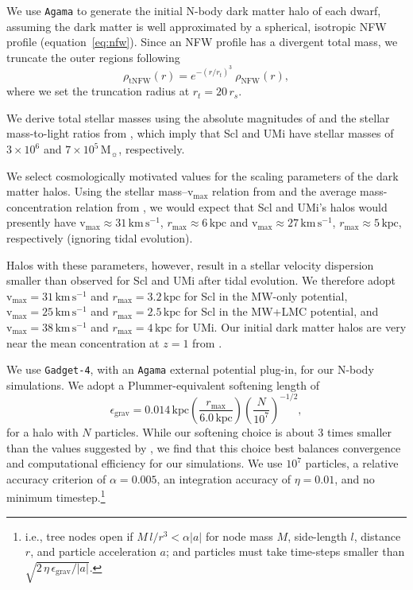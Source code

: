 \documentclass[times,trackchanges, twocolumn, twocolappendix]{aastex701}
\newcommand{\V}{\textrm{v}}
\newcommand{\vmax}{\V_\text{max}}
\newcommand{\rmax}{r_\text{max}}
\newcommand{\kpc}{\text{kpc}}
\newcommand{\kms}{\mathrm{km\,s^{-1}}}
\newcommand{\Mo}{\mathrm{M}_\sun}
\newcommand{\agama}{\texttt{Agama}}
\newcommand{\gadget}{\texttt{Gadget-4}}
\begin{document}
We use \agama{} \citep{agama} to generate the initial N-body dark matter
halo of each dwarf, assuming the dark matter is well approximated by a spherical, isotropic 
NFW profile (equation~\ref{eq:nfw}). Since an NFW profile has a divergent total mass, we truncate the outer regions following
\begin{equation}\label{eq:trunc_nfw}
    \rho_\text{tNFW}(r) = e^{-(r/r_t)^3}\ \rho_\text{NFW}(r),
\end{equation}
where we set the truncation radius at $r_t = 20 \, r_s$. 

We derive total stellar masses using the absolute magnitudes of \citet{munoz+2018} and the stellar mass-to-light ratios from \citet{woo+courteau+dekel2008}, which imply that Scl and UMi have stellar masses of $3\times10^6$ and $7\times10^5\,\Mo$, respectively.

We select cosmologically motivated values for the scaling parameters of the dark matter halos. Using the stellar mass--$\vmax$ relation from \citet{fattahi+2018} and the average mass-concentration relation from \citet{ludlow+2016}, we would expect that Scl
and UMi's halos would presently have $\vmax \approx 31 \,\kms$, $\rmax\approx6\,\kpc$ and
$\vmax \approx 27\,\kms$, $\rmax\approx5\,\kpc$, respectively (ignoring tidal evolution). 

Halos with these parameters, however, result in a stellar velocity dispersion smaller than observed for Scl and UMi after tidal evolution. We therefore adopt  $\vmax = 31\,\kms$ and $\rmax=3.2\,\kpc$ for Scl in the MW-only potential, $\vmax=25\,\kms$ and $\rmax=2.5\,\kpc$ for Scl in the MW+LMC potential, and
$\vmax=38\,\kms$ and $\rmax=4\,\kpc$ for UMi. 
Our initial dark matter halos are very near the mean concentration at $z=1$ from \citet{ludlow+2016}.


We use \gadget{}, with an \agama{} external potential plug-in, for our N-body simulations. 
We adopt a Plummer-equivalent softening length of
\begin{equation}\label{eq:softening_length}
    \epsilon_\text{grav} = 0.014\,\text{kpc}\left(\frac{r_\text{max}}{6.0\,\text{kpc}}\right)\left(\frac{N}{10^7}\right)^{-1/2},
\end{equation} 
for a halo with $N$ particles. While our softening choice is about 3 times smaller than the values suggested by \citet{power+2003}, we find that this choice best balances convergence and computational efficiency for our simulations.
We use $10^7$ particles, a relative accuracy criterion of $\alpha=0.005$, an integration accuracy of $\eta=0.01$, and no minimum timestep.\footnote{i.e., tree nodes open if $M\,l/r^3 < \alpha |a|$ for node mass $M$, side-length $l$, distance $r$, and particle acceleration $a$; and particles must take time-steps smaller than $\sqrt{2\,\eta\,\epsilon_\text{grav} / |a|}$.}
\end{document}
